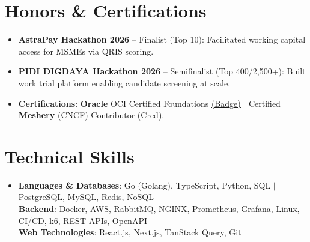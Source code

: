 \documentclass[letterpaper,11pt]{article}
\newcommand{\resumeItem}[1]{\item\small{#1}}
\begin{document}
\section{Honors \& Certifications}
  \begin{itemize}[leftmargin=12pt, label=\tiny$\bullet$, itemsep=0.5pt, parsep=0pt, topsep=0.3pt]
    \resumeItem{\textbf{AstraPay Hackathon 2026} -- Finalist (Top 10): Facilitated working capital access for MSMEs via QRIS scoring.}
    \resumeItem{\textbf{PIDI DIGDAYA Hackathon 2026} -- Semifinalist (Top 400/2,500+): Built work trial platform enabling candidate screening at scale.}
    \resumeItem{\textbf{Certifications}: \textbf{Oracle} OCI Certified Foundations \href{https://catalog-education.oracle.com/ords/certview/sharebadge_m?id=8B649FA58712B4081E58C95EC3618C77402518C510B850A9C86F02FCB73960A5}{\underline{(Badge)}} $|$ Certified \textbf{Meshery} (CNCF) Contributor \href{https://cloud.meshery.io/academy/certificates/dcd71d58-dd35-45d3-86a9-857ac980e08e}{\underline{(Cred)}}.}
  \end{itemize}\vspace{-2pt}

\section{Technical Skills}
  \begin{itemize}[leftmargin=0in, label={}, itemsep=0.5pt, parsep=0pt, topsep=0.3pt]
    \item\small{
      \textbf{Languages \& Databases}{: Go (Golang), TypeScript, Python, SQL $|$ PostgreSQL, MySQL, Redis, NoSQL} \\
      \textbf{Backend}{: Docker, AWS, RabbitMQ, NGINX, Prometheus, Grafana, Linux, CI/CD, k6, REST APIs, OpenAPI} \\
      \textbf{Web Technologies}{: React.js, Next.js, TanStack Query, Git}
    }
  \end{itemize}
\end{document}

